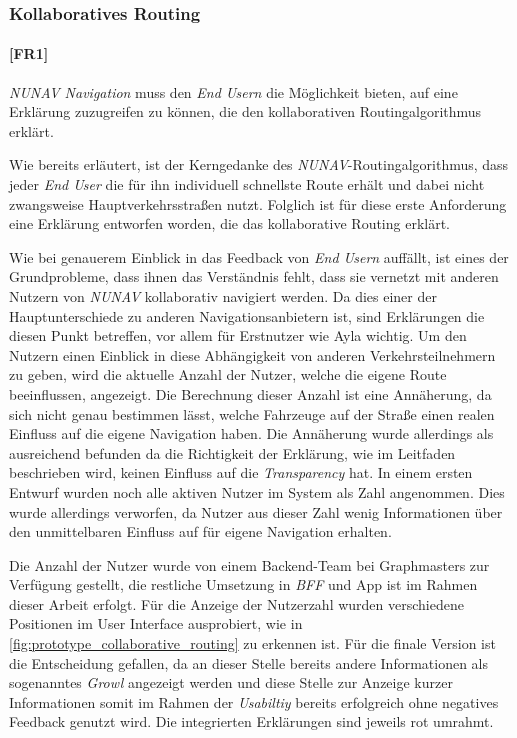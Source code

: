 \subsubsection{Kollaboratives Routing}

\paragraph{[FR1]} \textit{NUNAV Navigation} muss den \textit{End Usern} die Möglichkeit bieten, auf eine Erklärung zuzugreifen zu können, die den kollaborativen Routingalgorithmus erklärt.

\bigskip

Wie bereits erläutert, ist der Kerngedanke des \textit{NUNAV}-Routingalgorithmus, dass jeder \textit{End User} die für ihn individuell schnellste Route erhält und dabei nicht zwangsweise Hauptverkehrsstraßen nutzt. Folglich ist für diese erste Anforderung eine Erklärung entworfen worden, die das kollaborative Routing erklärt.

Wie bei genauerem Einblick in das Feedback von \textit{End Usern} auffällt, ist eines der Grundprobleme, dass ihnen das Verständnis fehlt, dass sie vernetzt mit anderen Nutzern von \textit{NUNAV} kollaborativ navigiert werden. Da dies einer der Hauptunterschiede zu anderen Navigationsanbietern ist, sind Erklärungen die diesen Punkt betreffen, vor allem für Erstnutzer wie Ayla wichtig. Um den Nutzern einen Einblick in diese Abhängigkeit von anderen Verkehrsteilnehmern zu geben, wird die aktuelle Anzahl der Nutzer, welche die eigene Route beeinflussen, angezeigt. Die Berechnung dieser Anzahl ist eine Annäherung, da sich nicht genau bestimmen lässt, welche Fahrzeuge auf der Straße einen realen Einfluss auf die eigene Navigation haben. Die Annäherung wurde allerdings als ausreichend befunden da die Richtigkeit der Erklärung, wie im Leitfaden beschrieben wird, keinen Einfluss auf die \textit{Transparency} hat. In einem ersten Entwurf wurden noch alle aktiven Nutzer im System als Zahl angenommen. Dies wurde allerdings verworfen, da Nutzer aus dieser Zahl wenig Informationen über den unmittelbaren Einfluss auf für eigene Navigation erhalten.

Die Anzahl der Nutzer wurde von einem Backend-Team bei Graphmasters zur Verfügung gestellt, die restliche Umsetzung in \textit{BFF} und App ist im Rahmen dieser Arbeit erfolgt. Für die Anzeige der Nutzerzahl wurden verschiedene Positionen im User Interface ausprobiert, wie in \autoref{fig:prototype_collaborative_routing} zu erkennen ist. Für die finale Version ist die Entscheidung gefallen, da an dieser Stelle bereits andere Informationen als sogenanntes \textit{Growl} angezeigt werden und diese Stelle zur Anzeige kurzer Informationen somit im Rahmen der \textit{Usabiltiy} bereits erfolgreich ohne negatives Feedback genutzt wird. Die integrierten Erklärungen sind jeweils rot umrahmt.


